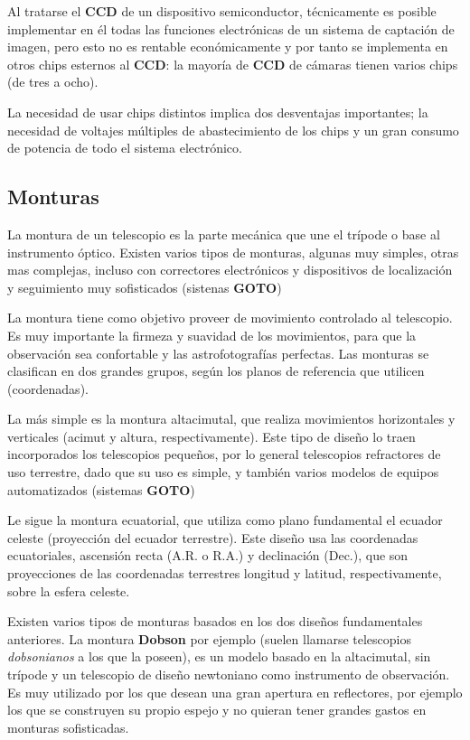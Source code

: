 \bigskip
Al tratarse el \textbf{CCD} de un dispositivo semiconductor, técnicamente es posible implementar en él todas las funciones electrónicas de un sistema de captación de imagen, pero esto no es rentable económicamente y por tanto se implementa en otros chips esternos al \textbf{CCD}: la mayoría de \textbf{CCD} de cámaras tienen varios chips (de tres a ocho).

\bigskip
La necesidad de usar chips distintos implica dos desventajas importantes; la necesidad de voltajes múltiples de abastecimiento de los chips y un gran consumo de potencia de todo el sistema electrónico.

\subsection{Monturas}

La montura de un telescopio es la parte mecánica que une el trípode o base al instrumento óptico. Existen varios tipos de monturas, algunas muy simples, otras mas complejas, incluso con correctores electrónicos y dispositivos de localización y seguimiento muy sofisticados (sistenas \textbf{GOTO})

\bigskip
La montura tiene como objetivo proveer de movimiento controlado al telescopio. Es muy importante la firmeza y suavidad de los movimientos, para que la observación sea confortable y las astrofotografías perfectas. Las monturas se clasifican en dos grandes grupos, según los planos de referencia que utilicen (coordenadas).

\bigskip
La más simple es la montura altacimutal, que realiza movimientos horizontales y verticales (acimut y altura, respectivamente). Este tipo de diseño lo traen incorporados los telescopios pequeños, por lo general telescopios refractores de uso terrestre, dado que su uso es simple, y también varios modelos de equipos automatizados (sistemas \textbf{GOTO})

\bigskip
Le sigue la montura ecuatorial, que utiliza como plano fundamental el ecuador celeste (proyección del ecuador terrestre). Este diseño usa las coordenadas ecuatoriales, ascensión recta (A.R. o R.A.) y declinación (Dec.), que son proyecciones de las coordenadas terrestres longitud y latitud, respectivamente, sobre la esfera celeste.

\bigskip
Existen varios tipos de monturas basados en los dos diseños fundamentales anteriores. La montura \textbf{Dobson} por ejemplo (suelen llamarse telescopios \textit{dobsonianos} a los que la poseen), es un modelo basado en la altacimutal, sin trípode y un telescopio de diseño newtoniano como instrumento de observación. Es muy utilizado por los que desean una gran apertura en reflectores, por ejemplo los que se construyen su propio espejo y no quieran tener grandes gastos en monturas sofisticadas.

